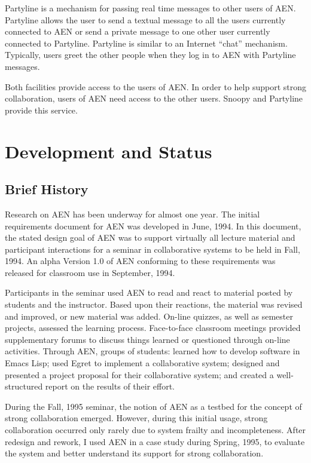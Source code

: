 Partyline is a mechanism for passing real time messages to other users of
AEN.  Partyline allows the user to send a textual message to all the users
currently connected to AEN or send a private message to one other user
currently connected to Partyline.  Partyline is similar to an Internet
``chat'' mechanism.  Typically, users greet the other people when they
log in to AEN with Partyline messages.

Both facilities provide access to the users of AEN.  In order to help
support strong collaboration, users of AEN need access to the other users.
Snoopy and Partyline provide this service.

\section{Development and Status}

\subsection{Brief History}

Research on AEN has been underway for almost one year.  The initial
requirements document for AEN \cite{csdl-94-06} was developed in June,
1994.  In this document, the stated design goal of AEN was to support
virtually all lecture material and participant interactions for a seminar
in collaborative systems to be held in Fall, 1994.  An alpha Version 1.0 of
AEN conforming to these requirements was released for classroom use in
September, 1994.  

Participants in the seminar used AEN to read and react to material posted
by students and the instructor.  Based upon their reactions, the material
was revised and improved, or new material was added. On-line quizzes, as
well as semester projects, assessed the learning process. Face-to-face
classroom meetings provided supplementary forums to discuss things learned
or questioned through on-line activities.  Through AEN, groups of students:
learned how to develop software in Emacs Lisp; used Egret to
implement a collaborative system; designed and presented a project proposal for
their collaborative system; and created a well-structured report on the results
of their effort.

During the Fall, 1995 seminar, the notion of AEN as a testbed for the
concept of strong collaboration emerged.  However, during this initial
usage, strong collaboration occurred only rarely due to system frailty and
incompleteness.  After redesign and rework, I used AEN in a case study
during Spring, 1995, to evaluate the system and better understand its
support for strong collaboration.


